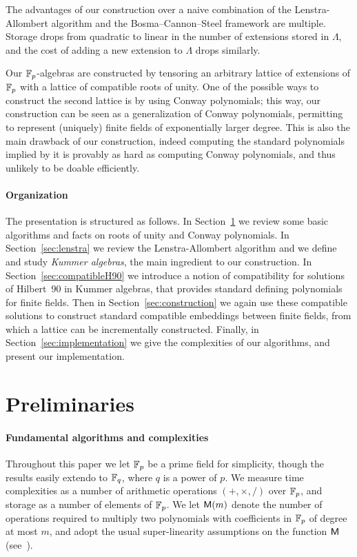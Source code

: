 \documentclass{sig-alternate}
\begin{document}
The advantages of our construction over a naive combination of the
Lenstra-Allombert algorithm and the Bosma--Cannon--Steel framework are
multiple. %
Storage drops from quadratic to linear in the number of extensions
stored in $\Lambda$, and the cost of adding a new extension to
$\Lambda$ drops similarly. %

Our $\mathbb{F}_{p}$-algebras are constructed by tensoring an arbitrary
lattice of extensions of $\mathbb{F}_{p}$ with a lattice of compatible roots
of unity. %
One of the possible ways to construct the second lattice is by using
Conway polynomials; this way, our construction can be seen as a
generalization of Conway polynomials, permitting to represent
(uniquely) finite fields of exponentially larger degree. %
This is also the main drawback of our construction, indeed computing
the standard polynomials implied by it is provably as hard as
computing Conway polynomials, and thus unlikely to be doable
efficiently.


\paragraph{Organization}
The presentation is structured as follows. %
In Section~\ref{sec:conway} we review some basic algorithms and facts
on roots of unity and Conway polynomials. %
In Section~\ref{sec:lenstra} we review the Lenstra-Allombert algorithm
and we define and study \emph{Kummer algebras}, the main ingredient to
our construction. %
In Section~\ref{sec:compatibleH90} we introduce a notion of
compatibility for solutions of Hilbert~90 in Kummer algebras, that
provides standard defining polynomials for finite fields.  Then in
Section~\ref{sec:construction} we again use these compatible solutions
to construct standard compatible embeddings between finite fields,
from which a lattice can be incrementally constructed.  Finally, in
Section~\ref{sec:implementation} we give the complexities of our
algorithms, and present our implementation.


\section{Preliminaries}
\label{sec:conway}

\paragraph{Fundamental algorithms and complexities}
Throughout this paper we let $\mathbb{F}_p$ be a prime field for simplicity, though the
results easily extendo to $\mathbb{F}_q$, where $q$ is a power of $p$. We measure
time complexities as a number of arithmetic operations $(+,\times,/)$
over $\mathbb{F}_p$, and storage as a number of elements of $\mathbb{F}_p$. %
We let $\mathsf{M}(m)$ denote the number of operations required to multiply
two polynomials with coefficients in $\mathbb{F}_p$ of degree at most $m$, and
adopt the usual super-linearity assumptions on the function $\mathsf{M}$
(see~\cite[Ch.~8.3]{vzGG}).
\end{document}
